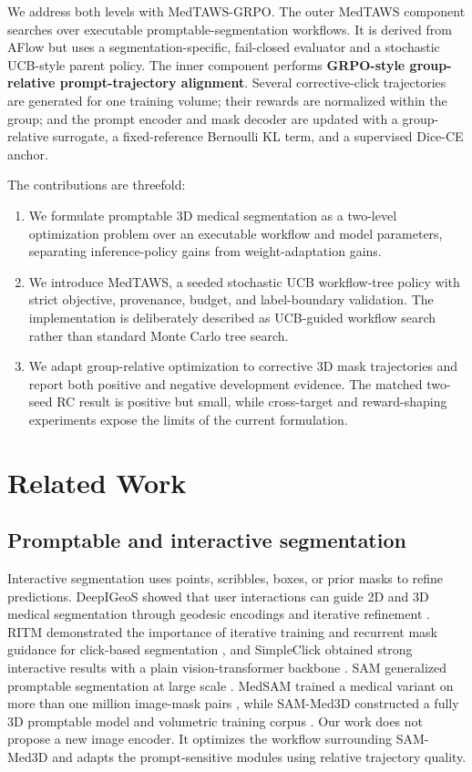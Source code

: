 \documentclass[10pt]{article}
\begin{document}
We address both levels with MedTAWS-GRPO. The outer MedTAWS component searches over executable promptable-segmentation workflows. It is derived from AFlow \cite{aflow} but uses a segmentation-specific, fail-closed evaluator and a stochastic UCB-style parent policy. The inner component performs \textbf{GRPO-style group-relative prompt-trajectory alignment}. Several corrective-click trajectories are generated for one training volume; their rewards are normalized within the group; and the prompt encoder and mask decoder are updated with a group-relative surrogate, a fixed-reference Bernoulli KL term, and a supervised Dice-CE anchor.

The contributions are threefold:

\begin{enumerate}
\item We formulate promptable 3D medical segmentation as a two-level optimization problem over an executable workflow and model parameters, separating inference-policy gains from weight-adaptation gains.
\item We introduce MedTAWS, a seeded stochastic UCB workflow-tree policy with strict objective, provenance, budget, and label-boundary validation. The implementation is deliberately described as UCB-guided workflow search rather than standard Monte Carlo tree search.
\item We adapt group-relative optimization to corrective 3D mask trajectories and report both positive and negative development evidence. The matched two-seed RC result is positive but small, while cross-target and reward-shaping experiments expose the limits of the current formulation.
\end{enumerate}
\section{Related Work}
\subsection{Promptable and interactive segmentation}
Interactive segmentation uses points, scribbles, boxes, or prior masks to refine predictions. DeepIGeoS showed that user interactions can guide 2D and 3D medical segmentation through geodesic encodings and iterative refinement \cite{deepigeos}. RITM demonstrated the importance of iterative training and recurrent mask guidance for click-based segmentation \cite{ritm}, and SimpleClick obtained strong interactive results with a plain vision-transformer backbone \cite{simpleclick}. SAM generalized promptable segmentation at large scale \cite{sam}. MedSAM trained a medical variant on more than one million image-mask pairs \cite{medsam}, while SAM-Med3D constructed a fully 3D promptable model and volumetric training corpus \cite{sammed3d}. Our work does not propose a new image encoder. It optimizes the workflow surrounding SAM-Med3D and adapts the prompt-sensitive modules using relative trajectory quality.
\end{document}
